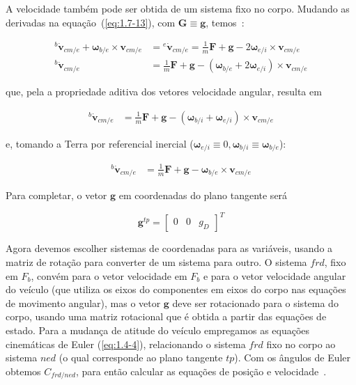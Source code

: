 A velocidade também pode ser obtida de um sistema fixo no corpo. Mudando as derivadas na equação~(\ref{eq:1.7-13}), com \(\mathbf{G} \equiv \mathbf{g}\), temos~\cite{Stevens2016}:

\begin{align}\label{eq:1.7-16a}
   {^{b}{\dot{\mathbf{v}}}_{cm/e}} + \mathbf{\omega}_{b/e} \times \mathbf{v}_{cm/e} &= {^{e}{\dot{\mathbf{v}}_{cm/e}}} = \textstyle{\frac{1}{m}}\mathbf{F} + \mathbf{g} - 2 \mathbf{\omega}_{e/i} \times \mathbf{v}_{cm/e} \\
   {^{b}{\dot{\mathbf{v}}_{cm/e}}} &= \textstyle{\frac{1}{m}} \mathbf{F} + \mathbf{g} - \left( \mathbf{\omega}_{b/e} + 2 {\mathbf{\omega}_{e/i}} \right) \times \mathbf{v}_{cm/e}
\end{align}

que, pela a propriedade aditiva dos vetores velocidade angular, resulta em

\begin{align}\label{eq:1.7-16b}
    {^{b}{\dot{\mathbf{v}}_{cm/e}}} &= \textstyle{\frac{1}{m}} \mathbf{F} + \mathbf{g} - {\left( \mathbf{\omega}_{b/i} + \mathbf{\omega}_{e/i} \right)} \times \mathbf{v}_{cm/e}
\end{align}

e, tomando a Terra por referencial inercial (\(\mathbf{\omega}_{e/i} \equiv 0 , \mathbf{\omega}_{b/i} \equiv \mathbf{\omega}_{b/e}\)):

\begin{align}\label{eq:1.7-16c}
   {^{b}{\dot{\mathbf{v}}_{cm/e}}} &= \textstyle{\frac{1}{m}} \mathbf{F} + \mathbf{g} - \mathbf{\omega}_{b/e} \times \mathbf{v}_{cm/e}
\end{align}

Para completar, o vetor \(\mathbf{g}\) em coordenadas do plano tangente será\footnotemark{}

\begin{equation}
\mathbf{g}^{tp} = {\begin{bmatrix} 0 & 0& g_{D} \end{bmatrix}}^{T}
\end{equation}

Agora devemos escolher sistemas de coordenadas para as variáveis, usando a matriz de rotação para converter de um sistema para outro. O sistema \(frd\), fixo em \(F_{b}\), convém para o vetor velocidade em \(F_{b}\) e para o vetor velocidade angular do veículo (que utiliza os eixos do componentes em eixos do corpo nas equações de movimento angular), mas o vetor \(\mathbf{g}\)  deve ser rotacionado para o sistema do corpo, usando uma matriz rotacional que é obtida a partir das equações de estado. Para a mudança de atitude do veículo empregamos as equações cinemáticas de Euler (\ref{eq:1.4-4}), relacionando o sistema \(frd\) fixo no corpo ao sistema \(ned\) (o qual  corresponde ao plano tangente \(tp\)). Com os ângulos de Euler obtemos \(C_{frd/ned}\), para então calcular as equações de posição e velocidade~\cite{Stevens2016}.

